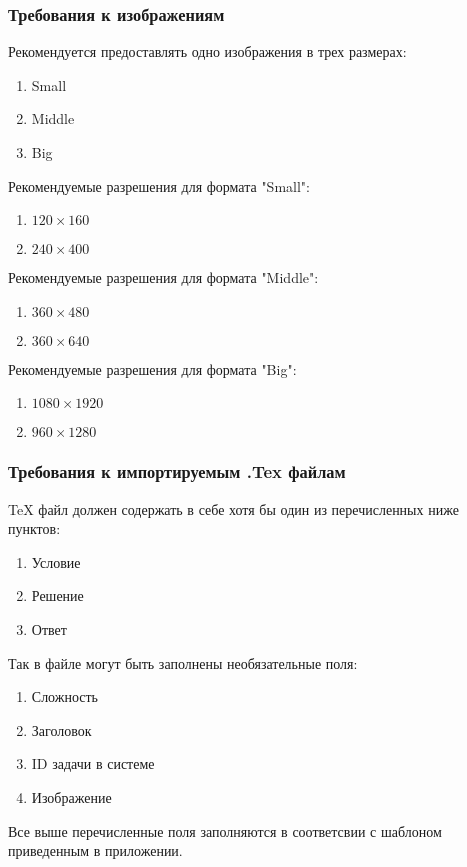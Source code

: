\subsubsection{Требования к изображениям}
Рекомендуется предоставлять одно изображения в трех размерах:
\begin{enumerate}
    \item Small
    \item Middle
    \item Big
\end{enumerate}
Рекомендуемые разрешения для формата "Small":
\begin{enumerate}
    \item $120 \times 160$
    \item $240 \times 400$
\end{enumerate}
Рекомендуемые разрешения для формата "Middle":
\begin{enumerate}
    \item $ 360 \times 480 $
    \item $ 360 \times 640 $
\end{enumerate}
Рекомендуемые разрешения для формата "Big":
\begin{enumerate}
    \item $ 1080 \times 1920 $
    \item $ 960 \times 1280 $
\end{enumerate}
\subsubsection{Требования к импортируемым .Tex файлам}
TeX файл должен содержать в себе хотя бы один из перечисленных ниже пунктов:
\begin{enumerate}
    \item Условие
    \item Решение
    \item Ответ
\end{enumerate}

Так в файле могут быть заполнены необязательные поля:
\begin{enumerate}
    \item Сложность
    \item Заголовок
    \item ID задачи в системе
    \item Изображение
\end{enumerate}

Все выше перечисленные поля заполняются в соответсвии с шаблоном приведенным в приложении.

